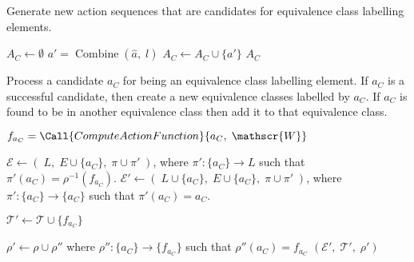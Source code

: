 \begin{algorithm}[H]
\caption{
Generate new action sequences that are candidates for equivalence class labelling elements.
}
\hrulefill
\begin{algorithmic}[1]
    \State $A_{C} \gets \emptyset$
            \State $a' = \operatorname{Combine}(\hat{a}, \; l)$
            \State $A_{C} \gets A_{C} \cup \{a'\}$
    \EndFor
    \State \Return $A_{C}$
\EndProcedure
\end{algorithmic}
\end{algorithm}


\begin{algorithm}[H]
\caption{
Process a candidate $a_{C}$ for being an equivalence class labelling element.
If $a_{C}$ is a successful candidate, then create a new equivalence classes labelled by $a_{C}$.
If $a_{C}$ is found to be in another equivalence class then add it to that equivalence class.
}
\hrulefill
\begin{algorithmic}[1]
    \State $f_{a_{C}} = \Call{ComputeActionFunction}{a_{C}, \; \mathscr{W}}$

        \Statex {}
        \State $\mathcal{E} \gets (\; L, \; E \cup \{a_{C}\}, \; \pi \cup \pi' \;)$, where $\pi': \{a_{C}\} \to L$ such that $\pi'(a_{C}) = \rho^{-1}(f_{a_{C}})$.
    \Else
        \Statex {}
        \State $\mathcal{E}' \gets (\; L \cup \{a_{C}\}, \; E \cup \{a_{C}\}, \; \pi \cup \pi' \;)$, where $\pi': \{a_{C}\} \to \{a_{C}\}$ such that $\pi'(a_{C}) = a_{C}$.

        \Statex {}
        \State $\mathcal{T}' \gets \mathcal{T} \cup \{f_{a_{C}}\}$

        \Statex {}
        \State $\rho' \gets \rho \cup \rho''$ where $\rho'': \{a_{C}\} \to \{f_{a_{C}}\}$ such that $\rho''(a_{C}) = f_{a_{C}}$
    \EndIf
    \State \Return $(\mathcal{E}', \; \mathcal{T}', \; \rho')$
\EndProcedure
\end{algorithmic}
\end{algorithm}




